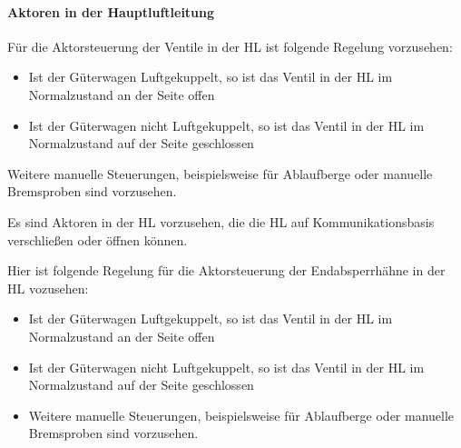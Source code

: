 \paragraph{Aktoren in der Hauptluftleitung}\par
Für die Aktorsteuerung der Ventile in der HL ist folgende Regelung vorzusehen:
\begin{itemize}
    \item Ist der Güterwagen Luftgekuppelt, so ist das Ventil in der HL im Normalzustand an der Seite offen
    \item Ist der Güterwagen nicht Luftgekuppelt, so ist das Ventil in der HL im Normalzustand auf der Seite geschlossen
\end{itemize}
Weitere manuelle Steuerungen, beispielsweise für Ablaufberge oder manuelle Bremsproben sind vorzusehen.
\begin{feat}
Es sind Aktoren in der HL vorzusehen, die die HL auf Kommunikationsbasis verschließen oder öffnen können.
\end{feat}
\begin{rem}
Hier ist folgende Regelung für die Aktorsteuerung der Endabsperrhähne in der HL vozusehen:
\begin{itemize}
    \item Ist der Güterwagen Luftgekuppelt, so ist das Ventil in der HL im Normalzustand an der Seite offen
    \item Ist der Güterwagen nicht Luftgekuppelt, so ist das Ventil in der HL im Normalzustand auf der Seite geschlossen
    \item Weitere manuelle Steuerungen, beispielsweise für Ablaufberge oder manuelle Bremsproben sind vorzusehen.
\end{itemize}
\end{rem}

